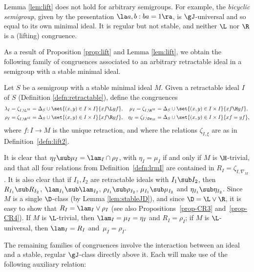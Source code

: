 Lemma \ref{lem:lift} does not hold for arbitrary semigroups.  For example, the \emph{bicyclic semigroup}, given by the presentation $\la a,b:ba=1\ra$, is $\gJ$-universal and so equal to its own minimal ideal.  It is regular but not stable, and neither $\L$ nor $\R$ is a (lifting) congruence.

As a result of Proposition \ref{prop:lift} and Lemma \ref{lem:lift}, we obtain
the following family of congruences associated to an arbitrary retractable
ideal in a semigroup with a stable minimal ideal.

\begin{definition}
\label{defn:lrmI}
Let $S$ be a semigroup with a stable minimal ideal $M$.  Given a retractable ideal $I$ of $S$ (Definition \ref{defn:retractable}), define the congruences
\begin{align*}
\lambda_I=\zeta_{I,{\L^M}}&=\Delta_S\cup\set{ (x,y)\in I\times I}{ xf\L yf},
  &\mu_I=\zeta_{I,{\H^M}}&=\Delta_S\cup\set{ (x,y)\in I\times I}{ xf\H yf},\\
%
\rho_I=\zeta_{I,{\R^M}}&=\Delta_S\cup\set{ (x,y)\in I\times I}{ xf\R yf},
  &\eta_I=\zeta_{I,\De_M}&=\Delta_S\cup\set{ (x,y)\in I\times I}{ xf= yf},
\end{align*}
where $f:I\to M$ is the unique retraction, and where the relations $\zeta_{I,\xi}$ are as in Definition~\ref{defn:lift2}.
\end{definition}

It is clear that $\eta_I\sub\mu_I=\lam_I\cap\rho_I$, with $\eta_I=\mu_I$ if and only if $M$ is $\H$-trivial, and that all four relations from Definition~\ref{defn:lrmI} are contained in $R_I=\zeta_{I,\nabla_M}$.  
It is also clear that if $I_1,I_2$ are retractable ideals with $I_1\sub I_2$, then $R_{I_1}\sub R_{I_2}$, $\lam_{I_1}\sub \lam_{I_2}$, $\rho_{I_1}\sub \rho_{I_2}$, $\mu_{I_1}\sub \mu_{I_2}$ and $\eta_{I_1}\sub \eta_{I_2}$.  Since $M$ is a single $\D$-class (by Lemma \ref{lem:stableJD}), and since ${\D}={\L}\vee{\R}$, it is easy to show that $R_I=\lam_I\vee\rho_I$ (see also Propositions~\ref{prop-CR3} and~\ref{prop-CR4}).  If $M$ is $\L$-trivial, then $\lam_I=\mu_I=\eta_I$ and $R_I=\rho_I$; if $M$ is $\L$-universal, then $\lam_I=R_I$ and~$\mu_I=\rho_I$.

The remaining families of congruences involve the interaction between an ideal and a stable, regular $\gJ$-class directly above it.  Each will make use of the following auxiliary relation:

